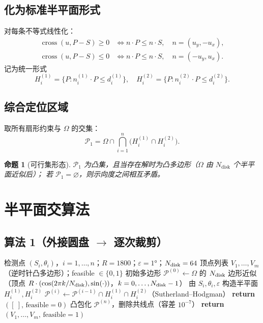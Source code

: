 \documentclass[a4paper,11pt]{article}
\newtheorem{proposition}{命题}
\begin{document}
\subsection{化为标准半平面形式}

对每条不等式线性化：
\begin{align*}
\operatorname{cross}(u,P-S)\ge 0
&\iff n\cdot P\le n\cdot S,\quad n=(u_y,-u_x),\\
\operatorname{cross}(u,P-S)\le 0
&\iff n\cdot P\le n\cdot S,\quad n=(-u_y,u_x).
\end{align*}
记为统一形式
\[
H_i^{(1)}=\{P:n_i^{(1)}\cdot P\le d_i^{(1)}\},\quad
H_i^{(2)}=\{P:n_i^{(2)}\cdot P\le d_i^{(2)}\}.
\]

\subsection{综合定位区域}
取所有扇形约束与 $\Omega$ 的交集：
\begin{equation}
\mathcal P_1
=\Omega\cap\bigcap_{i=1}^{n}\bigl(H_i^{(1)}\cap H_i^{(2)}\bigr).
\label{eq:localization}
\end{equation}

\begin{proposition}[可行集形态]
$\mathcal P_1$ 为凸集，且当存在解时为凸多边形（$\Omega$ 由 $N_{\text{disk}}$ 个半平面近似后）；
若 $\mathcal P_1=\varnothing$，则示向度之间相互矛盾。
\end{proposition}

\section{半平面交算法}

\subsection{算法 1（外接圆盘 $\to$ 逐次裁剪）}

\begin{algorithm}[H]
\caption{构造定位多边形 $\mathcal P_1$}
\label{alg:1}
\begin{algorithmic}[1]
\REQUIRE 检测点 $(S_i,\theta_i)$，$i=1,\dots,n$；$R=1800$；$\varepsilon=1°$；$N_{\rm disk}=64$
\ENSURE 顶点列表 $V_1,\dots,V_m$（逆时针凸多边形）；feasible $\in\{0,1\}$
\STATE 初始多边形 $\mathcal P^{(0)}\leftarrow \Omega$ 的 $N_{\rm disk}$ 边形近似（顶点 $R\cdot(\cos(2\pi k/N_{\rm disk}),\sin(\cdot))$，$k=0,\dots,N_{\rm disk}-1$）
   \STATE 由 $S_i,\theta_i,\varepsilon$ 构造半平面 $H_i^{(1)},H_i^{(2)}$
   \STATE $\mathcal P^{(i)}\leftarrow \mathcal P^{(i-1)}\cap H_i^{(1)}\cap H_i^{(2)}$（Sutherland--Hodgman）
      \STATE \textbf{return} $([\ ],\,\text{feasible}=0)$
   \ENDIF
\ENDFOR
\STATE 凸包化 $\mathcal P^{(n)}$，删除共线点（容差 $10^{-7}$）
\STATE \textbf{return} $(V_1,\dots,V_m,\,\text{feasible}=1)$
\end{algorithmic}
\end{algorithm}
\end{document}
